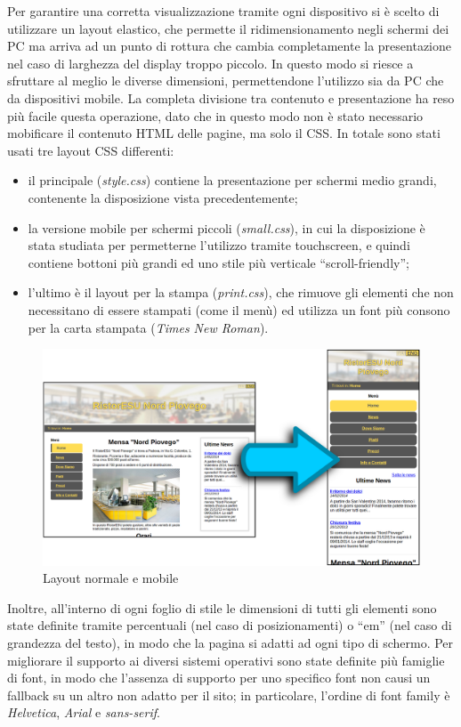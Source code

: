 \documentclass[10pt,a4paper,onecolumn]{article}
\begin{document}
Per garantire una corretta visualizzazione tramite ogni dispositivo si è scelto di utilizzare un layout elastico, che permette il ridimensionamento negli schermi dei PC ma arriva ad un punto di rottura che cambia completamente la presentazione nel caso di larghezza del display troppo piccolo. In questo modo si riesce a sfruttare al meglio le diverse dimensioni, permettendone l'utilizzo sia da PC che da dispositivi mobile.
La completa divisione tra contenuto e presentazione ha reso più facile questa operazione, dato che in questo modo non è stato necessario mobificare il contenuto HTML delle pagine, ma solo il CSS.
In totale sono stati usati tre layout CSS differenti:
\begin{itemize}
 \item il principale (\textit{style.css}) contiene la presentazione per schermi medio grandi, contenente la disposizione vista precedentemente;
 \item la versione mobile per schermi piccoli (\textit{small.css}), in cui la disposizione è stata studiata per permetterne l'utilizzo tramite touchscreen, e quindi contiene bottoni più grandi ed uno stile più verticale ``scroll-friendly'';
 \item l'ultimo è il layout per la stampa (\textit{print.css}), che rimuove gli elementi che non necessitano di essere stampati (come il menù) ed utilizza un font più consono per la carta stampata (\textit{Times New Roman}).
\end{itemize}

\begin{figure}[h]
\centering
\includegraphics[scale=0.20]{trasformazione}
\caption{Layout normale e mobile}
\label{trasformazioneMobile}
\end{figure}

Inoltre, all'interno di ogni foglio di stile le dimensioni di tutti gli elementi sono state definite tramite percentuali (nel caso di posizionamenti) o ``em'' (nel caso di grandezza del testo), in modo che la pagina si adatti ad ogni tipo di schermo.
Per migliorare il supporto ai diversi sistemi operativi sono state definite più famiglie di font, in modo che l'assenza di supporto per uno specifico font non causi un fallback su un altro non adatto per il sito; in particolare, l'ordine di font family è \textit{Helvetica}, \textit{Arial} e \textit{sans-serif}.
\end{document}
